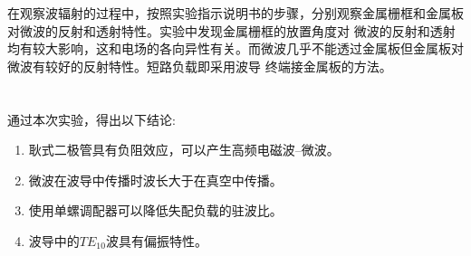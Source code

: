 ﻿\documentclass[10.5pt]{article}
\begin{document}
在观察波辐射的过程中，按照实验指示说明书的步骤，分别观察金属栅框和金属板对微波的反射和透射特性。实验中发现金属栅框的放置角度对
微波的反射和透射均有较大影响，这和电场的各向异性有关。而微波几乎不能透过金属板但金属板对微波有较好的反射特性。短路负载即采用波导
终端接金属板的方法。

\section{\textbf{}}

通过本次实验，得出以下结论:
\begin{enumerate}
\item 耿式二极管具有负阻效应，可以产生高频电磁波--微波。
\item 微波在波导中传播时波长大于在真空中传播。
\item 使用单螺调配器可以降低失配负载的驻波比。
\item 波导中的$TE_{10}$波具有偏振特性。
\end{enumerate}
\end{document}
